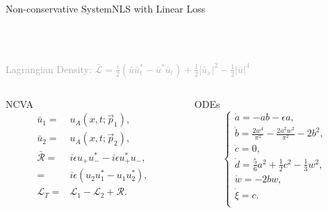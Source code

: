 \begin{frame}[c]{Non-conservative System}{NLS with Linear Loss}
\begin{center}
   \\
\end{center}
 
  \\

\textcolor{darkgray}{\small{Lagrangian Density: $\bar{\mathcal{L}} =  \frac{i}{2} \left(\bar{u} \bar{u}_{t}^* - \bar{u}^* \bar{u}_{t} \right)  + \frac{1}{2} |\bar{u}_{x}|^2 - \frac{1}{2} |\bar{u}|^4$}}

\begin{columns}
\begin{column}{0.5\textwidth}
\begin{block}{NCVA }
\vspace{-1em}
\begin{align} 
 \bar{u}_1 =& u_A(x, t; \vec{p}_1), \nonumber \\
 \bar{u}_2 =& u_A(x, t; \vec{p}_2),  \nonumber \\
\bar{\mathcal{R}} =& i \epsilon u_+ u_-^* - i \epsilon u_+^*u_-, \nonumber \\
=&  i \epsilon (u_2u_1^* - u_1 u_2^* ),\nonumber \\
\mathcal{L}_T =& \mathcal{L}_1 - \mathcal{L}_2 + \mathcal{R}. \nonumber
 \end{align} 
\vspace{-1em}
\end{block}
\end{column}
\begin{column}{0.5\textwidth}
\begin{alertblock}{ODEs}
\vspace{-1em}
 \[ \begin{cases} 
 \dot{a} = - ab -  \epsilon a, \\ 
 \dot{b} = \frac{2w^4}{\pi^2} - \frac{2a^2 w^2}{\pi^2} - 2 b^2, \\
 \dot{c} = 0, \\ 
 \dot{d} = \frac{5}{6} a^2 + \frac{1}{2} c^2 - \frac{1}{3} w^2, \\
\dot{w} = -2bw, \\
 \dot{\xi} = c. \\ 
 \end{cases} \] 
\end{alertblock}
\end{column}
\end{columns}
\end{frame}

